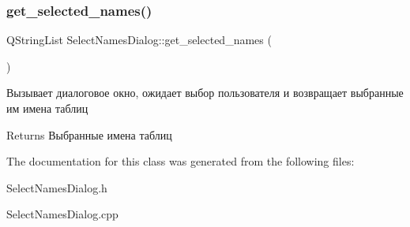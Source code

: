 \subsubsection{\texorpdfstring{get\+\_\+selected\+\_\+names()}{get\_selected\_names()}}
{\footnotesize\ttfamily Q\+String\+List Select\+Names\+Dialog\+::get\+\_\+selected\+\_\+names (\begin{DoxyParamCaption}{ }\end{DoxyParamCaption})}



Вызывает диалоговое окно, ожидает выбор пользователя и возвращает выбранные им имена таблиц 

\begin{DoxyReturn}{Returns}
Выбранные имена таблиц 
\end{DoxyReturn}


The documentation for this class was generated from the following files\+:\begin{DoxyCompactItemize}
\item 
Select\+Names\+Dialog.\+h\item 
Select\+Names\+Dialog.\+cpp\end{DoxyCompactItemize}

